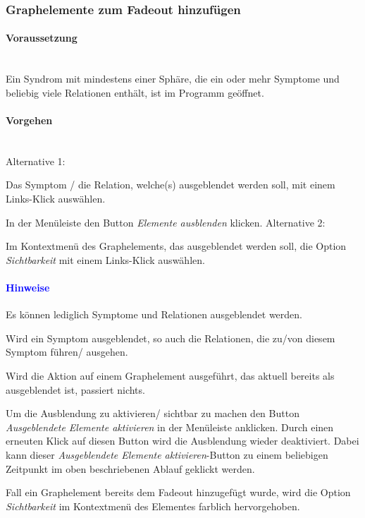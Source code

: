 \documentclass[enabledeprecatedfontcommands,fontsize=11pt,paper=a4,twoside]{scrartcl}
\newcounter{one}
\newcounter{two}[one]
\newcommand*{\hint}{\paragraph{\textcolor{blue}{Hinweise}}}
\newcommand*{\condition}{\paragraph{Voraussetzung}$\;$ \vspace{0.2cm}\\}
\newcommand*{\actions}{\paragraph{Vorgehen} $\;$\vspace{0.2cm}\\}
\newcommand*{\aOne}{\textcolor{bbe}{Alternative 1:}}
\newcommand*{\aTwo}{\textcolor{bbe}{Alternative 2:}}
\let\tempone\itemize
\let\temptwo\enditemize
\renewenvironment{itemize}{\tempone\addtolength{\itemsep}{-10.0pt}}{\temptwo}
\let\origenumerate\enumerate
\let\origendenumerate\endenumerate
\renewenvironment{enumerate}{\origenumerate \addtolength{\itemsep}{-10.0pt}}{\origendenumerate}
\begin{document}
\subsubsection{Graphelemente zum Fadeout hinzufügen}
	\condition 	
		Ein Syndrom mit mindestens einer Sphäre, die ein oder mehr Symptome und beliebig viele Relationen enthält, ist im Programm geöffnet. 
		\actions
		\aOne
		\begin{enumerate}
			\item Das Symptom / die Relation, welche(s) ausgeblendet werden soll, mit einem Links-Klick auswählen. 
			\item In der Menüleiste den Button \textit{Elemente ausblenden} klicken.
		\end{enumerate}
		\aTwo
		\begin{enumerate}
			\item Im Kontextmenü des Graphelements, das ausgeblendet werden soll, die Option \textit{Sichtbarkeit} mit einem Links-Klick auswählen.
		\end{enumerate}
		\hint
		\begin{itemize}
					\item Es können lediglich Symptome und Relationen ausgeblendet werden. 
					\item Wird ein Symptom ausgeblendet, so auch die Relationen, die zu/von diesem Symptom führen/ ausgehen.
					\item Wird die Aktion auf einem Graphelement ausgeführt, das aktuell bereits als ausgeblendet ist, passiert nichts.
					\item Um die Ausblendung zu aktivieren/ sichtbar zu machen den Button \textit{Ausgeblendete Elemente aktivieren} in der Menüleiste anklicken. Durch einen erneuten Klick auf diesen Button wird die Ausblendung wieder deaktiviert. Dabei kann dieser \textit{Ausgeblendete Elemente aktivieren}-Button zu einem beliebigen Zeitpunkt im oben beschriebenen Ablauf geklickt werden.
					\item Fall ein Graphelement bereits dem Fadeout hinzugefügt wurde, wird die Option \textit{Sichtbarkeit} im Kontextmenü des Elementes farblich hervorgehoben. \\
		\end{itemize}
		
\newpage
\end{document}
